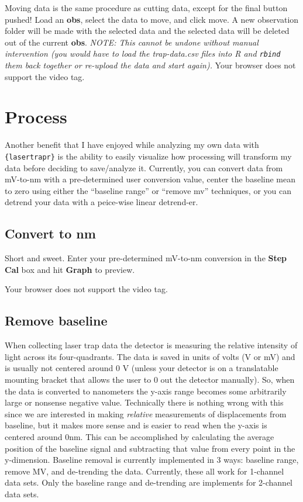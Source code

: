 \documentclass[
]{book}
\begin{document}
Moving data is the same procedure as cutting data, except for the final button pushed! Load an \textbf{obs}, select the data to move, and click move. A new observation folder will be made with the selected data and the selected data will be deleted out of the current \textbf{obs}. \emph{NOTE: This cannot be undone without manual intervention (you would have to load the trap-data.csv files into R and \texttt{rbind} them back together or re-upload the data and start again).}
Your browser does not support the video tag.

\section{Process}\label{process}

Another benefit that I have enjoyed while analyzing my own data with \texttt{\{lasertrapr\}} is the ability to easily visualize how processing will transform my data before deciding to save/analyze it. Currently, you can convert data from mV-to-nm with a pre-determined user conversion value, center the baseline mean to zero using either the ``baseline range'' or ``remove mv'' techniques, or you can detrend your data with a peice-wise linear detrend-er.

\subsection{Convert to nm}\label{convert-to-nm}

Short and sweet. Enter your pre-determined mV-to-nm conversion in the \textbf{Step Cal} box and hit \textbf{Graph} to preview.

Your browser does not support the video tag.

\subsection{Remove baseline}\label{remove-baseline}

When collecting laser trap data the detector is measuring the relative intensity of light across its four-quadrants. The data is saved in units of volts (V or mV) and is usually not centered around 0 V (unless your detector is on a translatable mounting bracket that allows the user to 0 out the detector manually). So, when the data is converted to nanometers the y-axis range becomes some arbitrarily large or nonsense negative value. Technically there is nothing wrong with this since we are interested in making \emph{relative} measurements of displacements from baseline, but it makes more sense and is easier to read when the y-axis is centered around 0nm. This can be accomplished by calculating the average position of the baseline signal and subtracting that value from every point in the y-dimension. Baseline removal is currently implemented in 3 ways: baseline range, remove MV, and de-trending the data. Currently, these all work for 1-channel data sets. Only the baseline range and de-trending are implements for 2-channel data sets.
\end{document}

